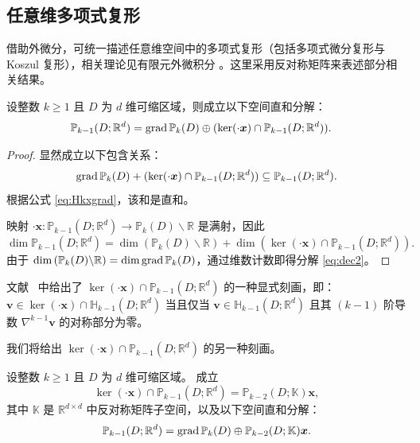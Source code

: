 \subsection{任意维多项式复形}

借助外微分，可统一描述任意维空间中的多项式复形（包括多项式微分复形与 Koszul 复形），相关理论见有限元外微积分 \cite{Arnold2018,ArnoldFalkWinther2006,ArnoldFalkWinther2010}。这里采用反对称矩阵来表述部分相关结果。


\begin{lemma}\label{lem:Pkdec}
设整数 $k \geq 1$ 且 $D$ 为 $d$ 维可缩区域，则成立以下空间直和分解：
\begin{align}
\mathbb P_{k-1}(D; \mathbb R^d) 
&= \operatorname{grad} \mathbb P_{k}(D)\oplus (\ker (\cdot \boldsymbol x)\cap \mathbb P_{k-1}(D;\mathbb R^d)). \label{eq:dec2}
\end{align}
\end{lemma}
\begin{proof}
显然成立以下包含关系：
$$
\operatorname{grad} \mathbb P_{k}(D)+ (\ker (\cdot \boldsymbol x)\cap \mathbb P_{k-1}(D;\mathbb R^d))\subseteq \mathbb P_{k-1}(D; \mathbb R^d).
$$
根据公式 \eqref{eq:Hkxgrad}，该和是直和。

映射 $\cdot\boldsymbol x: \mathbb P_{k-1}(D;\mathbb R^d) \to \mathbb P_{k}(D)\backslash \mathbb R$ 是满射，因此
$$
\dim\mathbb P_{k-1}(D; \mathbb R^d) 
= \dim(\mathbb P_{k}(D)\backslash \mathbb R) + \dim(\ker (\cdot \boldsymbol x)\cap \mathbb P_{k-1}(D;\mathbb R^d)).
$$
由于 $\dim \left( \mathbb P_{k}(D)\backslash \mathbb R \right) = \dim \operatorname{grad} \mathbb P_{k}(D)$，通过维数计数即得分解 \eqref{eq:dec2}。
\end{proof}

文献~\cite[Proposition~1]{Nedelec1980} 中给出了 $\ker (\cdot \boldsymbol x)\cap \mathbb P_{k-1}(D;\mathbb R^d)$ 的一种显式刻画，即：$\boldsymbol v\in \ker (\cdot \boldsymbol x)\cap \mathbb H_{k-1}(D;\mathbb R^d)$ 当且仅当 $\boldsymbol v\in \mathbb H_{k-1}(D;\mathbb R^d)$ 且其 $(k-1)$ 阶导数 $\nabla^{k-1}\boldsymbol v$ 的对称部分为零。

我们将给出 $\ker (\cdot \boldsymbol x)\cap \mathbb P_{k-1}(D;\mathbb R^d)$ 的另一种刻画。

\begin{lemma}\label{lem:kerx}
设整数 $k \geq 1$ 且 $D$ 为 $d$ 维可缩区域。 成立
\begin{equation}  \label{eq:dec1}
\ker (\cdot \boldsymbol x)\cap \mathbb P_{k-1}(D;\mathbb R^d) = \mathbb P_{k-2}(D;\mathbb K)\boldsymbol x,
\end{equation}
其中 $\mathbb K$ 是 $\mathbb R^{d\times d}$ 中反对称矩阵子空间，以及以下空间直和分解：
\begin{equation}\label{eq:Pkm1vecdecomp}
\mathbb P_{k-1}(D; \mathbb R^d)= \operatorname{grad} \mathbb P_{k}(D)\oplus\mathbb P_{k-2}(D;\mathbb K)\boldsymbol x.
\end{equation}
\end{lemma}

